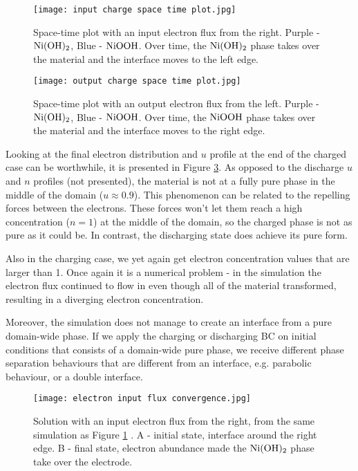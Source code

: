 \documentclass[12pt]{article}
\begin{document}
\begin{figure}[!h] 
	\centering 
	\texttt{[image: input charge space time plot.jpg]}
	\caption{Space-time plot with an input electron flux from the right. Purple - $\ce{Ni(OH)_2}$, Blue - $\ce{NiOOH}$. Over time, the $\ce{Ni(OH)_2}$ phase takes over the material and the interface moves to the left edge.} \label{fig:input-flux}
\end{figure}

\begin{figure}[!h] 
	\centering 
	\texttt{[image: output charge space time plot.jpg]}
	\caption{Space-time plot with an output electron flux from the left. Purple - $\ce{Ni(OH)_2}$, Blue - $\ce{NiOOH}$. Over time, the $\ce{NiOOH}$ phase takes over the material and the interface moves to the right edge.} \label{fig:output-flux}
\end{figure}

Looking at the final electron distribution and $u$ profile at the end of the charged case can be worthwhile, it is presented in Figure \ref{fig:output-flux-solution}. As opposed to the discharge $u$ and $n$ profiles (not presented), the material is not at a fully pure phase in the middle of the domain ($u \approx 0.9$). This phenomenon can be related to the repelling forces between the electrons. These forces won't let them reach a high concentration ($n=1$) at the middle of the domain, so the charged phase is not as pure as it could be. In contrast, the discharging state does achieve its pure form.

Also in the charging case, we yet again get electron concentration values that are larger than 1. Once again it is a numerical problem - in the simulation the electron flux continued to flow in even though all of the material transformed, resulting in a diverging electron concentration.

Moreover, the simulation does not manage to create an interface from a pure domain-wide phase. If we apply the charging or discharging BC on initial conditions that consists of a domain-wide pure phase, we receive different phase separation behaviours that are different from an interface, e.g. parabolic behaviour, or a double interface.

\begin{figure}[h!] 
	\centering 
	\texttt{[image: electron input flux convergence.jpg]}
	\caption{Solution with an input electron flux from the right, from the same simulation as Figure \ref{fig:input-flux} . A - initial state, interface around the right edge. B - final state, electron abundance made the $\ce{Ni(OH)_2}$ phase take over the electrode.} \label{fig:output-flux-solution}
\end{figure}
\end{document}
